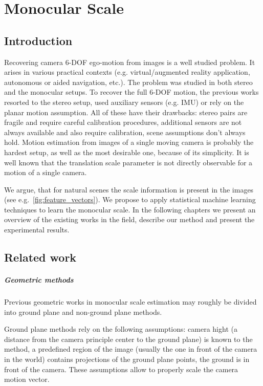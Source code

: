 \chapter{Monocular Scale}

\section{Introduction}

Recovering camera 6-DOF ego-motion from images is a well studied
problem. It arises in various practical contexts
(e.g. virtual/augmented reality application, autonomous or aided
navigation, etc.).  The problem was studied in both stereo and the
monocular setups.  To recover the full 6-DOF motion, the previous
works resorted to the stereo setup, used auxiliary sensors (e.g. IMU)
or rely on the planar motion assumption.  All of these have their
drawbacks: stereo pairs are fragile and require careful calibration
procedures, additional sensors are not always available and also
require calibration, scene assumptions don't always hold.  Motion
estimation from images of a single moving camera is probably the
hardest setup, as well as the most desirable one, because of its
simplicity.  It is well known that the translation scale parameter is
not directly observable for a motion of a single camera.

We argue, that for natural scenes the scale information is present in
the images (see e.g.~\ref{fig:feature_vectors}).  We propose to apply
statistical machine learning techniques to learn the monocular scale.
In the following chapters we present an overview of the existing works
in the field, describe our method and present the experimental
results.

\section{Related work}
\paragraph{Geometric methods} Previous geometric works in monocular
scale estimation may roughly be divided into ground plane and
non-ground plane methods.

Ground plane methods rely on the following assumptions: camera hight
(a distance from the camera principle center to the ground plane) is
known to the method, a predefined region of the image (usually the one
in front of the camera in the world) contains projections of the
ground plane points, the ground is in front of the camera.  These
assumptions allow to properly scale the camera motion vector.

